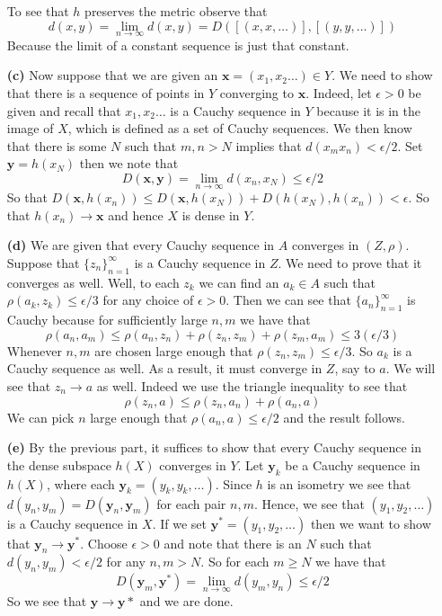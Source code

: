 \documentclass{article}
\newcommand{\seq}[2]{\{#1_{#2}\}_{#2 = 1}^\infty}
\begin{document}
\begin{enumerate}
  To see that $h$ preserves the metric observe that
  \[
  d(x,y) = \lim_{n\to\infty} d(x,y) = D([(x,x,\ldots)], [(y,y,\ldots)])
  \]
  Because the limit of a constant sequence is just that constant.
\item [\textbf{(c)}] Now suppose that we are given an $\textbf{x} =
  (x_1,x_2\ldots) \in Y$. We need to show that there is a sequence of
  points in $Y$ converging to $\textbf{x}$. Indeed, let $\epsilon > 0$
  be given and recall that $x_1,x_2\ldots$ is a Cauchy sequence in $Y$
  because it is in the image of $X$, which is defined as a set of
  Cauchy sequences. We then know that there is some $N$ such that $m,n
  > N$ implies that $d(x_mx_n) < \epsilon/2$. Set $\textbf{y} =
  h(x_N)$ then we note that
  \[
  D(\textbf{x},\textbf{y}) = \lim_{n\to\infty} d(x_n, x_N) \leq \epsilon/2
  \]
  So that $D(\textbf{x}, h(x_n)) \leq D(\textbf{x}, h(x_N)) +
  D(h(x_N),h(x_n)) < \epsilon$. So that $h(x_n) \to \textbf{x}$ and
  hence $X$ is dense in $Y$.
\item [\textbf{(d)}] We are given that every Cauchy sequence in $A$
  converges in $(Z,\rho)$. Suppose that $\seq{z}{n}$ is a Cauchy
  sequence in $Z$. We need to prove that it converges as well. Well,
  to each $z_k$ we can find an $a_k \in A$ such that $\rho(a_k,z_k)
  \leq \epsilon/3$ for any choice of $\epsilon > 0$. Then we can see
  that $\seq{a}{n}$ is Cauchy because for sufficiently large $n,m$ we
  have that
  \[
  \rho(a_n,a_m) \leq \rho(a_n,z_n) + \rho(z_n, z_m) + \rho(z_m,a_m)
  \leq 3(\epsilon/3)
  \]
  Whenever $n,m$ are chosen large enough that $\rho(z_n,z_m) \leq
  \epsilon/3$. So $a_k$ is a Cauchy sequence as well. As a result, it
  must converge in $Z$, say to $a$. We will see that $z_n \to a$ as
  well. Indeed we use the triangle inequality to see that
  \[
  \rho(z_n,a) \leq \rho(z_n,a_n) + \rho(a_n,a)
  \]
  We can pick $n$ large enough that $\rho(a_n,a) \leq \epsilon/2$ and
  the result follows.
\item [\textbf{(e)}] By the previous part, it suffices to show that
  every Cauchy sequence in the dense subspace $h(X)$ converges in
  $Y$. Let $\textbf{y}_k$ be a Cauchy sequence in $h(X)$, where each
  $\textbf{y}_k = (y_k, y_k, \ldots)$. Since $h$ is an isometry we see
  that $d(y_n,y_m) = D(\textbf{y}_n, \textbf{y}_m)$ for each pair
  $n,m$. Hence, we see that $(y_1,y_2,\ldots)$ is a Cauchy sequence in
  $X$. If we set $\textbf{y}^* = (y_1,y_2,\ldots)$ then we want to
  show that $\textbf{y}_n \to \textbf{y}^*$. Choose $\epsilon > 0$ and
  note that there is an $N$ such that $d(y_n,y_m) < \epsilon/2$ for
  any $n,m > N$. So for each $m \geq N$ we have that
  \[
  D(\textbf{y}_m, \textbf{y}^*) = \lim_{n\to\infty} d(y_m,y_n) \leq \epsilon/2
  \]
  So we see that $\textbf{y} \to \textbf{y}*$ and we are done.
\end{enumerate}
\end{document}
